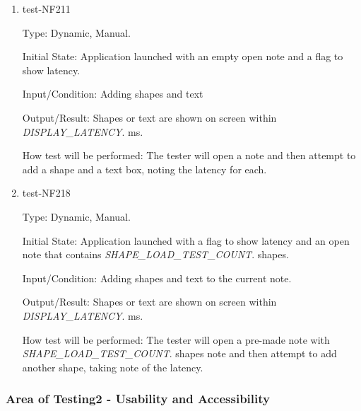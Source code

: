 \documentclass[12pt, titlepage]{article}
\begin{document}
\begin{enumerate}

\item{test-NF211}

Type: Dynamic, Manual.

Initial State: Application launched with an empty open note and a flag to show latency.

Input/Condition: Adding shapes and text

Output/Result: Shapes or text are shown on screen within \textit{DISPLAY\_LATENCY}. ms.

How test will be performed: The tester will open a note and then attempt to add a shape and a text box, noting the latency for each.

\item{test-NF218}

Type: Dynamic, Manual.

Initial State: Application launched with a flag to show latency and an open note that contains \textit{SHAPE\_LOAD\_TEST\_COUNT}. shapes.

Input/Condition: Adding shapes and text to the current note.

Output/Result: Shapes or text are shown on screen within \textit{DISPLAY\_LATENCY}. ms.

How test will be performed: The tester will open a pre-made note with \textit{SHAPE\_LOAD\_TEST\_COUNT}. shapes note and then attempt to add another shape, taking note of the latency.

\end{enumerate}

\subsubsection{Area of Testing2 - Usability and Accessibility}
\end{document}
